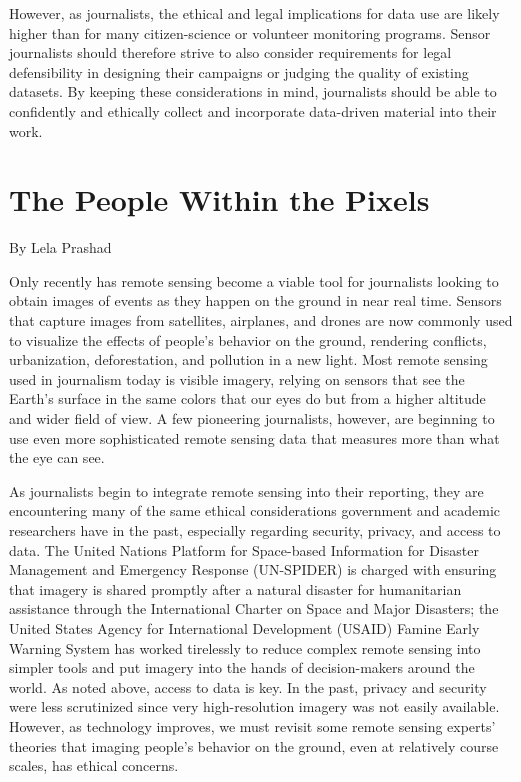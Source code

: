 \begin{itemize}
\begin{itemized}
However, as journalists, the ethical and legal implications for data use are
likely higher than for many citizen-science or volunteer monitoring programs.
Sensor journalists should therefore strive to also consider requirements
for legal defensibility in designing their campaigns or judging the
quality of existing datasets. By keeping these considerations in mind, journalists
should be able to confidently and ethically collect and incorporate
data-driven material into their work.

\chapter{The People Within the Pixels}
By Lela Prashad

Only recently has remote sensing become a viable tool for journalists looking
to obtain images of events as they happen on the ground in near real
time. Sensors that capture images from satellites, airplanes, and drones
are now commonly used to visualize the effects of people's behavior on the
ground, rendering conflicts, urbanization, deforestation, and pollution in a
new light. Most remote sensing used in journalism today is visible imagery,
relying on sensors that see the Earth's surface in the same colors that our
eyes do but from a higher altitude and wider field of view. A few pioneering
journalists, however, are beginning to use even more sophisticated remote
sensing data that measures more than what the eye can see.

As journalists begin to integrate remote sensing into their reporting, they
are encountering many of the same ethical considerations government
and academic researchers have in the past, especially regarding security,
privacy, and access to data. The United Nations Platform for Space-based
Information for Disaster Management and Emergency Response (UN-SPIDER)
is charged with ensuring that imagery is shared promptly after a natural
disaster for humanitarian assistance through the International Charter
on Space and Major Disasters; the United States Agency for International
Development (USAID) Famine Early Warning System has worked tirelessly
to reduce complex remote sensing into simpler tools and put imagery into
the hands of decision-makers around the world. As noted above, access to
data is key. In the past, privacy and security were less scrutinized since very
high-resolution imagery was not easily available. However, as technology improves, we must revisit some remote sensing experts' theories that imaging
people's behavior on the ground, even at relatively course scales, has
ethical concerns.


\end{itemized}
\end{itemize}

